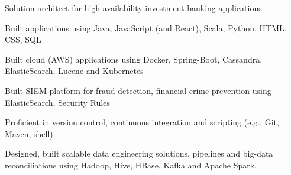 \begin{cvitems}
\sectionspace
\sectionspace
\vspace{1mm}
	\fontsize{11pt}{1.4em}\bodyfontlight\upshape\color{text}
        \item {Solution architect for high availability investment banking applications}
        \item {Built applications using Java, JavaScript (and React), Scala, Python, HTML, CSS, SQL}
        \item {Built cloud (AWS) applications using Docker, Spring-Boot, Cassandra, ElasticSearch, Lucene and Kubernetes}
        \item {Built SIEM platform for fraud detection, financial crime prevention using ElasticSearch, Security Rules}
        \item {Proficient in version control, continuous integration and scripting (e.g., Git, Maven, shell)}
        \item {Designed, built scalable data engineering solutions, pipelines and big-data reconciliations using Hadoop, Hive, HBase, Kafka and Apache Spark.}
        \end{cvitems}
\vspace{1mm}
\sectionspace
